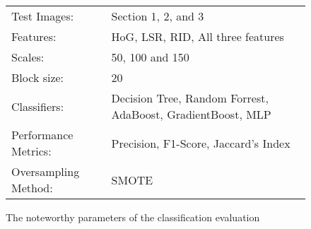 \begin{figure}
	\centering
	\begin{tabular}{|ll|}
		\hline
		Test Images: & Section 1, 2, and 3 \\
		Features: & HoG, LSR, RID, All three features\\
		Scales: & 50, 100 and 150 \\
		Block size: & 20\\
		Classifiers: & Decision Tree, Random Forrest, AdaBoost, GradientBoost, MLP \\
		Performance Metrics: & Precision, F1-Score, Jaccard's Index\\
		Oversampling Method: & SMOTE\\
		\hline
	\end{tabular}
	\caption{The noteworthy parameters of the classification evaluation}
	\label{fig:params}
\end{figure}

